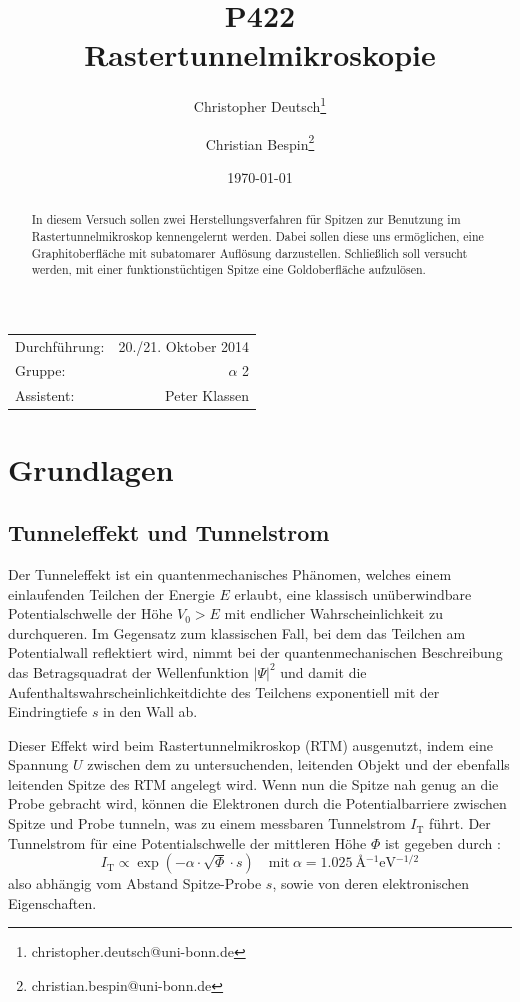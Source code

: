 \documentclass[10pt, a4paper]{article}
\title{P422 \\ Rastertunnelmikroskopie}
\author{Christopher Deutsch\footnote{christopher.deutsch@uni-bonn.de} \and Christian Bespin\footnote{christian.bespin@uni-bonn.de}}
\date{\today}
\begin{document}
  
\maketitle

\begin{center}
\begin{tabular}{l r}
Durchführung: & 20./21. Oktober 2014 \\
Gruppe: &$\alpha$ 2 \\
Assistent: & Peter Klassen
\end{tabular}
\end{center}

\begin{abstract}
\noindent
In diesem Versuch sollen zwei Herstellungsverfahren für Spitzen zur Benutzung im Rastertunnelmikroskop kennengelernt werden. Dabei sollen diese uns ermöglichen, eine Graphitoberfläche mit subatomarer Auflösung darzustellen. Schließlich soll versucht werden, mit einer funktionstüchtigen Spitze eine Goldoberfläche aufzulösen.
\end{abstract}

\tableofcontents
\newpage

\section{Grundlagen}

\subsection{Tunneleffekt und Tunnelstrom}
Der Tunneleffekt ist ein quantenmechanisches Phänomen, welches einem einlaufenden Teilchen der Energie $E$ erlaubt, eine klassisch unüberwindbare Potentialschwelle der Höhe $V_0 > E$ mit endlicher Wahrscheinlichkeit zu durchqueren.
Im Gegensatz zum klassischen Fall, bei dem das Teilchen am Potentialwall reflektiert wird, nimmt bei der quantenmechanischen Beschreibung das Betragsquadrat der Wellenfunktion $|\Psi|^2$ und damit die Aufenthaltswahrscheinlichkeitdichte des Teilchens exponentiell mit der Eindringtiefe $s$ in den Wall ab.

Dieser Effekt wird beim Rastertunnelmikroskop (RTM) ausgenutzt, indem eine Spannung $U$ zwischen dem zu untersuchenden, leitenden Objekt und der ebenfalls leitenden Spitze des RTM angelegt wird.
Wenn nun die Spitze nah genug an die Probe gebracht wird, können die Elektronen durch die Potentialbarriere zwischen Spitze und Probe tunneln, was zu einem messbaren Tunnelstrom $I_\mathrm{T}$ führt.
Der Tunnelstrom für eine Potentialschwelle der mittleren Höhe $\Phi$ ist gegeben durch \cite{binning}:
\begin{equation}
  I_\mathrm{T} \propto \exp(-\alpha \cdot \sqrt{\Phi} \cdot s) \quad \text{mit}\: \alpha = \SI{1,025}{\angstrom^{-1}\electronvolt^{-1/2}}
  \label{eq:tunnelstrom}
\end{equation}
also abhängig vom Abstand Spitze-Probe $s$, sowie von deren elektronischen Eigenschaften.
\end{document}
